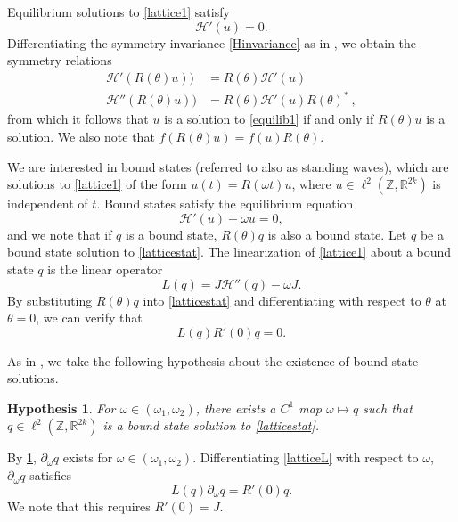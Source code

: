 \documentclass[12pt]{elsarticle}
\def\R{{\mathbb R}}
\def\Z{{\mathbb Z}}
\newtheorem{hypothesis}{Hypothesis}
\begin{document}
Equilibrium solutions to \cref{lattice1} satisfy 
\begin{equation}\label{equilib1}
\mathcal{H}'(u) = 0.
\end{equation}
Differentiating the symmetry invariance \cref{Hinvariance} as in \cite{Grillakis1987}, we obtain the symmetry relations
\begin{equation}\label{symmetryrel}
\begin{aligned}
\mathcal{H}'(R(\theta)u)) &= R(\theta) \mathcal{H}'(u) \\
\mathcal{H}''(R(\theta)u)) &= R(\theta) \mathcal{H}'(u) R(\theta)^* \:,
\end{aligned}
\end{equation}
from which it follows that $u$ is a solution to \cref{equilib1} if and only if $R(\theta)u$ is a solution. We also note that $f(R(\theta)u) = f(u)R(\theta)$.

We are interested in bound states (referred to also
as standing waves), which are solutions to \cref{lattice1} of the form $u(t) = R(\omega t)u$, where $u \in \ell^2(\Z, \R^{2k})$ is independent of $t$. Bound states satisfy the equilibrium equation
\begin{equation}\label{latticestat}
\mathcal{H}'(u) - \omega u = 0,
\end{equation}
and we note that if $q$ is a bound state, $R(\theta)q$ is also a bound state. Let $q$ be a bound state solution to \cref{latticestat}. The linearization of \cref{lattice1} about a bound state $q$ is the linear operator
\begin{equation}\label{latticeL}
L(q) = J \mathcal{H}''(q) - \omega J.
\end{equation}
By substituting $R(\theta)q$ into \cref{latticestat} and differentiating with respect to $\theta$ at $\theta = 0$, we can verify that 
\begin{equation}\label{Lkernel1}
L(q) R'(0) q = 0.
\end{equation}

\noindent As in \cite{Grillakis1987}, we take the following hypothesis about the existence of bound state solutions.
\begin{hypothesis}\label{boundstatehyp}
For $\omega \in (\omega_1, \omega_2)$, there exists a $C^1$ map $\omega \mapsto q$ such that $q \in \ell^2(\Z, \R^{2k})$ is a bound state solution to \cref{latticestat}.
\end{hypothesis}

By \cref{boundstatehyp}, $\partial_\omega q$ exists for $\omega \in (\omega_1, \omega_2)$. Differentiating \cref{latticeL} with respect to $\omega$, $\partial_\omega q$ satisfies 
\begin{equation}\label{Lkernel2}
L(q)\partial_\omega q = R'(0) q.
\end{equation}
We note that this requires $R'(0) = J$.
\end{document}
